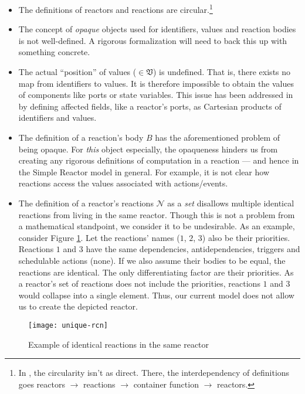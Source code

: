 \begin{itemize}
    \item The definitions of reactors and reactions are circular.\footnote{
        In \cite{cyphy}, the circularity isn't as direct.
        There, the interdependency of definitions goes reactors $\to$ reactions $\to$ container function $\to$ reactors.
    }
    \item The concept of \emph{opaque} objects used for identifiers, values and reaction bodies is not well-defined. 
    A rigorous formalization will need to back this up with something concrete.
    \item The actual ``position'' of values ($\in \mathfrak{V}$) is undefined.
    That is, there exists no map from identifiers to values.
    It is therefore impossible to obtain the values of components like ports or state variables.
    This issue has been addressed in \cite{marten} by defining affected fields, like a reactor's ports, as Cartesian products of identifiers and values.
    \item The definition of a reaction's body $B$ has the aforementioned problem of being opaque.
    For \emph{this} object especially, the opaqueness hinders us from creating any rigorous definitions of computation in a reaction — and hence in the Simple Reactor model in general.
    For example, it is not clear how reactions access the values associated with actions/events.  
    \item The definition of a reactor's reactions $\mathcal{N}$ as a \emph{set} disallows multiple identical reactions from living in the same reactor.
    Though this is not a problem from a mathematical standpoint, we consider it to be undesirable.
    As an example, consider Figure \ref{fig:unique-rcn}.
    Let the reactions' names ($1$, $2$, $3$) also be their priorities.
    Reactions $1$ and $3$ have the same dependencies, antidependencies, triggers and schedulable actions (none).
    If we also assume their bodies to be equal, the reactions are identical.
    The only differentiating factor are their priorities.
    As a reactor's set of reactions does not include the priorities, reactions $1$ and $3$ would collapse into a single element.
    Thus, our current model does not allow us to create the depicted reactor.
\end{itemize}

\begin{figure}[!h]
\centering
\texttt{[image: unique-rcn]}
\caption{Example of identical reactions in the same reactor}
\label{fig:unique-rcn}
\end{figure}

